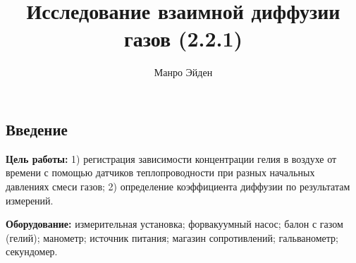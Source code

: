 \documentclass[a4paper, 12pt]{article}
\title{\textbf{Исследование взаимной диффузии газов (2.2.1)}}
\author{Манро Эйден}
\date{}
\begin{document}
\maketitle

\begin{center}
\section*{Введение}
\end{center}

\noindent \textbf{Цель работы:} 1) регистрация зависимости концентрации гелия в воздухе от времени с помощью датчиков теплопроводности при разных начальных давлениях смеси газов; 2) определение коэффициента диффузии по результатам измерений.

    \bigskip

    \noindent \textbf{Оборудование:} измерительная установка; форвакуумный насос; балон с газом  (гелий); манометр; источник питания; магазин сопротивлений; гальванометр; секундомер.
\end{document}
